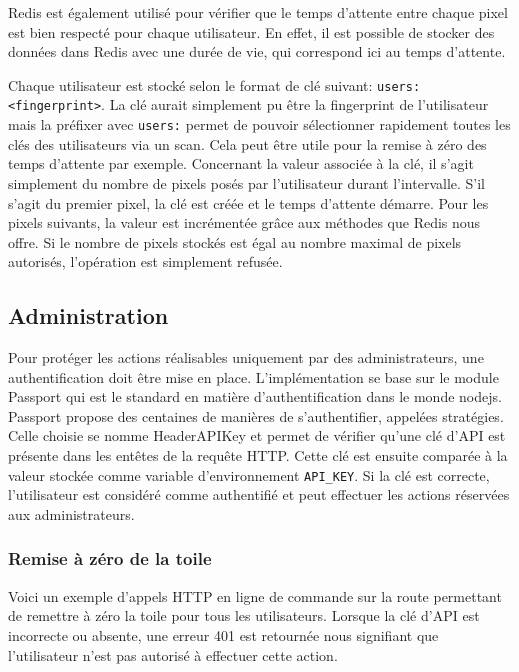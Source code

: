 Redis est également utilisé pour vérifier que le temps d'attente entre chaque pixel est bien respecté pour chaque utilisateur. En effet, il est possible de stocker des données dans Redis avec une durée de vie, qui correspond ici au temps d'attente.

Chaque utilisateur est stocké selon le format de clé suivant: \texttt{users:<fingerprint>}. La clé aurait simplement pu être la fingerprint de l'utilisateur mais la préfixer avec \texttt{users:} permet de pouvoir sélectionner rapidement toutes les clés des utilisateurs via un scan. Cela peut être utile pour la remise à zéro des temps d'attente par exemple. Concernant la valeur associée à la clé, il s'agit simplement du nombre de pixels posés par l'utilisateur durant l'intervalle. S'il s'agit du premier pixel, la clé est créée et le temps d'attente démarre. Pour les pixels suivants, la valeur est incrémentée grâce aux méthodes que Redis nous offre. Si le nombre de pixels stockés est égal au nombre maximal de pixels autorisés, l'opération est simplement refusée.

\subsection{Administration}

Pour protéger les actions réalisables uniquement par des administrateurs, une authentification doit être mise en place. L'implémentation se base sur le module Passport \cite{passport} qui est le standard en matière d'authentification dans le monde \gls{nodejs}. Passport propose des centaines de manières de s'authentifier, appelées stratégies. Celle choisie se nomme HeaderAPIKey \cite{passport-headerapikey} et permet de vérifier qu'une clé d'API est présente dans les entêtes de la requête HTTP. Cette clé est ensuite comparée à la valeur stockée comme variable d'environnement \texttt{API_KEY}. Si la clé est correcte, l'utilisateur est considéré comme authentifié et peut effectuer les actions réservées aux administrateurs.

\subsubsection{Remise à zéro de la toile}

Voici un exemple d'appels HTTP en ligne de commande sur la route permettant de remettre à zéro la toile pour tous les utilisateurs. Lorsque la clé d'API est incorrecte ou absente, une erreur 401 est retournée nous signifiant que l'utilisateur n'est pas autorisé à effectuer cette action.

